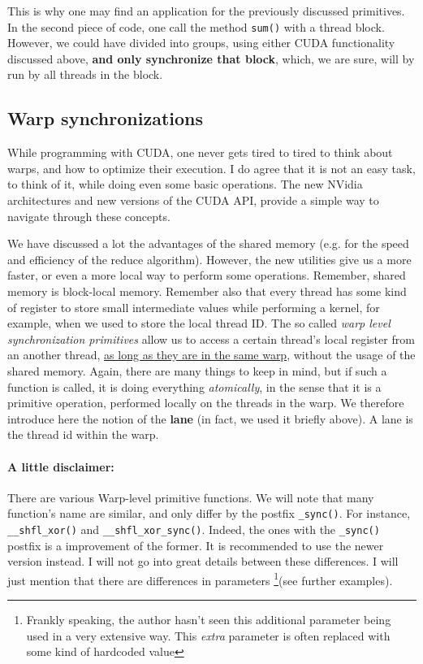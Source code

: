 \documentclass[12pt]{article}
\begin{document}
This is why one may find an application for the previously discussed primitives. 
In the second piece of code, one call the method \verb|sum()| with a thread block. However, 
we could have divided into groups, using either CUDA functionality discussed above, 
\textbf{and only synchronize that block}, which, we are sure, will by run by all threads in 
the block. 

\subsection*{Warp synchronizations}
While programming with CUDA, one never gets tired to tired to think about warps, and 
how to optimize their execution. I do agree that it is not an easy task, to think of it, 
while doing even some basic operations. The new NVidia architectures and new versions of the
CUDA API, provide a simple way to navigate through these concepts.

We have discussed a lot the advantages of the shared memory (e.g. for the speed and efficiency
of the reduce algorithm). However, the new utilities give us a more faster, or even a more
local way to perform some operations. Remember, shared memory is block-local memory. 
Remember also that every thread has some kind of register to store small intermediate 
values while performing a kernel, for example, when
we used to store the local thread ID. 
The so called \textit{warp level synchronization primitives}
allow us to access a certain thread's local register from an another thread,
\underline{as long as they are in the same warp}, without 
the usage of the shared memory. Again, there are many things to keep in mind, 
but if such a function is called, it is doing everything \textit{atomically}, 
in the sense that it is a primitive operation, performed locally on the threads in the 
warp. We therefore introduce here the notion of the 
\textbf{lane} (in fact, we used it briefly above). A lane is the thread id within the warp.


\paragraph{A little disclaimer: }There are various Warp-level primitive functions. We will note that many function's
name are similar, and only differ by the postfix \verb|_sync()|. For instance, 
\verb|__shfl_xor()| and \verb|__shfl_xor_sync()|. Indeed, the ones with the \verb|_sync()|
postfix is a improvement of the former. It is recommended to use the newer version instead.
I will not go into great details between these differences. 
I will just mention that there are differences in parameters
\footnote{Frankly speaking, the author hasn't seen this additional parameter 
being used in a very extensive way. This \textit{extra} parameter is often replaced with 
some kind of hardcoded value}(see further examples).
\end{document}
